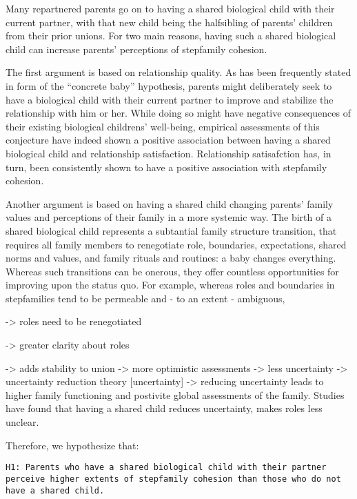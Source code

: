 \documentclass[\pandocDocMode,longtable,floatsintext]{apa6}
\begin{document}
Many repartnered parents go on to having a shared biological child with
their current partner, with that new child being the halfsibling of
parents' children from their prior unions. For two main reasons, having
such a shared biological child can increase parents' perceptions of
stepfamily cohesion.

The first argument is based on relationship quality. As has been
frequently stated in form of the ``concrete baby'' hypothesis, parents
might deliberately seek to have a biological child with their current
partner to improve and stabilize the relationship with him or her. While
doing so might have negative consequences of their existing biological
childrens' well-being, empirical assessments of this conjecture have
indeed shown a positive association between having a shared biological
child and relationship satisfaction. Relationship satisafction has, in
turn, been consistently shown to have a positive association with
stepfamily cohesion.

Another argument is based on having a shared child changing parents'
family values and perceptions of their family in a more systemic way.
The birth of a shared biological child represents a subtantial family
structure transition, that requires all family members to renegotiate
role, boundaries, expectations, shared norms and values, and family
rituals and routines: a baby changes everything. Whereas such
transitions can be onerous, they offer countless opportunities for
improving upon the status quo. For example, whereas roles and boundaries
in stepfamilies tend to be permeable and - to an extent - ambiguous,

-\textgreater{} roles need to be renegotiated

-\textgreater{} greater clarity about roles

-\textgreater{} adds stability to union -\textgreater{} more optimistic
assessments -\textgreater{} less uncertainty -\textgreater{} uncertainty
reduction theory {[}uncertainty{]} -\textgreater{} reducing uncertainty
leads to higher family functioning and postivite global assessments of
the family. Studies have found that having a shared child reduces
uncertainty, makes roles less unclear.

Therefore, we hypothesize that:

\begin{verbatim}
H1: Parents who have a shared biological child with their partner perceive higher extents of stepfamily cohesion than those who do not have a shared child.
\end{verbatim}
\end{document}
